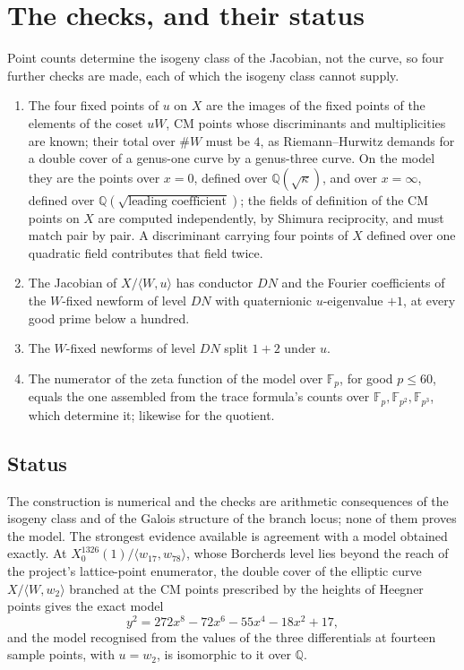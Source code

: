 \documentclass[11pt,reqno]{amsart}
\theoremstyle{plain}
\theoremstyle{definition}
\newcommand{\Q}{\mathbb{Q}}
\newcommand{\F}{\mathbb{F}}
\begin{document}
\section{The checks, and their status}

Point counts determine the isogeny class of the Jacobian, not the curve, so four further checks
are made, each of which the isogeny class cannot supply.

\begin{enumerate}
\item[(a)] The four fixed points of $u$ on $X$ are the images of the fixed points of the elements
of the coset $uW$, CM points whose discriminants and multiplicities are known; their total over
$\#W$ must be $4$, as Riemann--Hurwitz demands for a double cover of a genus-one curve by a
genus-three curve. On the model they are the points over $x=0$, defined over $\Q(\sqrt\kappa)$,
and over $x=\infty$, defined over $\Q(\sqrt{\text{leading coefficient}})$; the fields of definition
of the CM points on $X$ are computed independently, by Shimura reciprocity, and must match pair by
pair. A discriminant carrying four points of $X$ defined over one quadratic field contributes that
field twice.
\item[(b)] The Jacobian of $X/\langle W,u\rangle$ has conductor $DN$ and the Fourier coefficients
of the $W$-fixed newform of level $DN$ with quaternionic $u$-eigenvalue $+1$, at every good prime
below a hundred.
\item[(c)] The $W$-fixed newforms of level $DN$ split $1+2$ under $u$.
\item[(d)] The numerator of the zeta function of the model over $\F_p$, for good $p\le60$, equals
the one assembled from the trace formula's counts over $\F_p,\F_{p^2},\F_{p^3}$, which determine
it; likewise for the quotient.
\end{enumerate}

\subsection*{Status}
The construction is numerical and the checks are arithmetic consequences of the isogeny class
and of the Galois structure of the branch locus; none of them proves the model. The strongest
evidence available is agreement with a model obtained exactly. At $X_0^{1326}(1)/\langle
w_{17},w_{78}\rangle$, whose Borcherds level lies beyond the reach of the project's lattice-point
enumerator, the double cover of the elliptic curve $X/\langle W,w_2\rangle$ branched at the CM
points prescribed by the heights of Heegner points gives the exact model
\[
y^2=272x^8-72x^6-55x^4-18x^2+17,
\]
and the model recognised from the values of the three differentials at fourteen sample points,
with $u=w_2$, is isomorphic to it over $\Q$.
\end{document}
